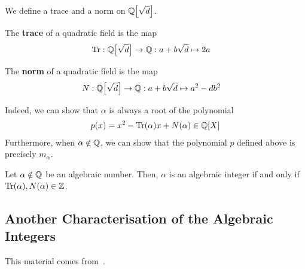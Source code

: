 We define a trace and a norm on $\mathbb{Q}\!\left[ \sqrt{d} \right]$.

\begin{boxdefinition}[Trace]
    The \textbf{trace} of a quadratic field is the map
    \begin{align*}
        \operatorname{Tr} : \mathbb{Q}\!\left[ \sqrt{d} \right] &\to \mathbb{Q} : a + b\sqrt{d} \mapsto 2a
    \end{align*}
\end{boxdefinition}

\begin{boxdefinition}[Norm]
    The \textbf{norm} of a quadratic field is the map
    \begin{align*}
        N : \mathbb{Q}\!\left[ \sqrt{d} \right] &\to \mathbb{Q} : a + b\sqrt{d} \mapsto a^2 - db^2
    \end{align*}
\end{boxdefinition}

Indeed, we can show that $\alpha$ is always a root of the polynomial
\begin{align*}
    p(x) = x^2 - \operatorname{Tr}(\alpha) x + N(\alpha) \in \mathbb{Q}\!\left[ X \right]
\end{align*}
Furthermore, when $\alpha \notin \mathbb{Q}$, we can show that the polynomial $p$ defined above is precisely $m_{\alpha}$.

\begin{boxproposition}
    Let $\alpha \notin \mathbb{Q}$ be an algebraic number. Then, $\alpha$ is an algebraic integer if and only if $\operatorname{Tr}(\alpha), N(\alpha) \in \mathbb{Z}$.
\end{boxproposition}

\subsection{Another Characterisation of the Algebraic Integers}

This material comes from~\cite[\S 2.2]{GeorgeBoxer}.


    

